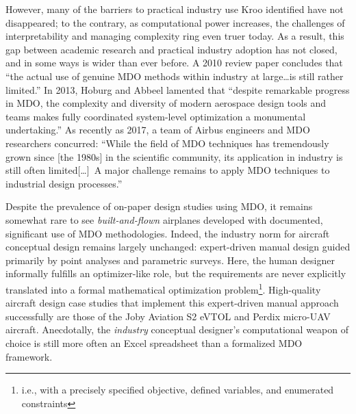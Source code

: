 \documentclass[12pt,vi,oneside]{report}
\begin{document}
    However, many of the barriers to practical industry use Kroo identified have not disappeared; to the contrary, as computational power increases, the challenges of interpretability and managing complexity ring even truer today. As a result, this gap between academic research and practical industry adoption has not closed, and in some ways is wider than ever before. A 2010 review paper \cite{agte_mdo_2010} concludes that ``the actual use of genuine MDO methods within industry at large\dots is still rather limited.'' In 2013, Hoburg and Abbeel lamented that ``despite remarkable progress in MDO, the complexity and diversity of modern aerospace design tools and teams makes fully coordinated system-level optimization a monumental undertaking.'' \cite{hoburg_geometric_2014} As recently as 2017, a team of Airbus engineers and MDO researchers concurred: ``While the field of MDO techniques has tremendously grown since [the 1980s] in the scientific community, its application in industry is still often limited[\dots]\ A major challenge remains to apply MDO techniques to industrial design processes.'' \cite{gazaix_industrialization_2017}


    Despite the prevalence of on-paper design studies using MDO, it remains somewhat rare to see \textit{built-and-flown} airplanes developed with documented, significant use of MDO methodologies. Indeed, the industry norm for aircraft conceptual design remains largely unchanged: expert-driven manual design guided primarily by point analyses and parametric surveys. Here, the human designer informally fulfills an optimizer-like role, but the requirements are never explicitly translated into a formal mathematical optimization problem\footnote{i.e., with a precisely specified objective, defined variables, and enumerated constraints}. High-quality aircraft design case studies that implement this expert-driven manual approach successfully are those of the Joby Aviation S2 eVTOL \cite{stoll_conceptual_2014} and Perdix micro-UAV \cite{tao_design_2012} aircraft. Anecdotally, the \textit{industry} conceptual designer's computational weapon of choice is still more often an Excel spreadsheet than a formalized MDO framework.
\end{document}
